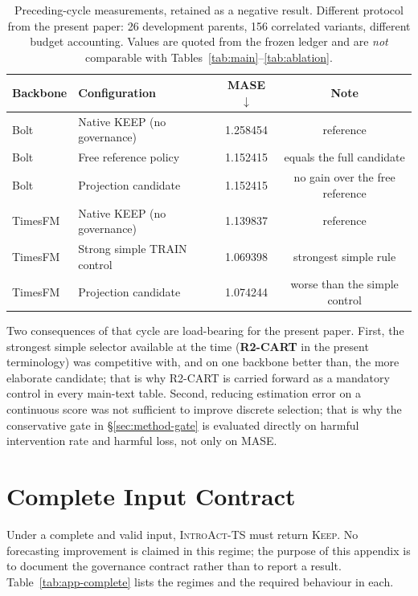 \documentclass{article}
\newcommand{\introact}{\textsc{IntroAct-TS}}
\begin{document}
\begin{table}[h]
  \caption{Preceding-cycle measurements, retained as a negative result. Different protocol
  from the present paper: 26 development parents, 156 correlated variants, different
  budget accounting. Values are quoted from the frozen ledger and are \emph{not}
  comparable with Tables~\ref{tab:main}--\ref{tab:ablation}.}
  \label{tab:r5negative}
  \centering
  \small
  \begin{tabular}{llcc}
    \toprule
    Backbone & Configuration & MASE $\downarrow$ & Note \\
    \midrule
    Bolt     & Native KEEP (no governance)   & 1.258454 & reference \\
    Bolt     & Free reference policy         & 1.152415 & equals the full candidate \\
    Bolt     & Projection candidate          & 1.152415 & no gain over the free reference \\
    TimesFM  & Native KEEP (no governance)   & 1.139837 & reference \\
    TimesFM  & Strong simple TRAIN control   & 1.069398 & strongest simple rule \\
    TimesFM  & Projection candidate          & 1.074244 & worse than the simple control \\
    \bottomrule
  \end{tabular}
\end{table}

Two consequences of that cycle are load-bearing for the present paper. First, the strongest
simple selector available at the time (\textbf{R2-CART} in the present terminology) was
competitive with, and on one backbone better than, the more elaborate candidate; that is
why R2-CART is carried forward as a mandatory control in every main-text table. Second,
reducing estimation error on a continuous score was not sufficient to improve discrete
selection; that is why the conservative gate in \S\ref{sec:method-gate} is evaluated
directly on harmful intervention rate and harmful loss, not only on MASE.

\section{Complete Input Contract}
\label{app:complete}
Under a complete and valid input, \introact{} must return \textsc{Keep}. No forecasting
improvement is claimed in this regime; the purpose of this appendix is to document the
governance contract rather than to report a result. Table~\ref{tab:app-complete} lists the
regimes and the required behaviour in each.
\end{document}
